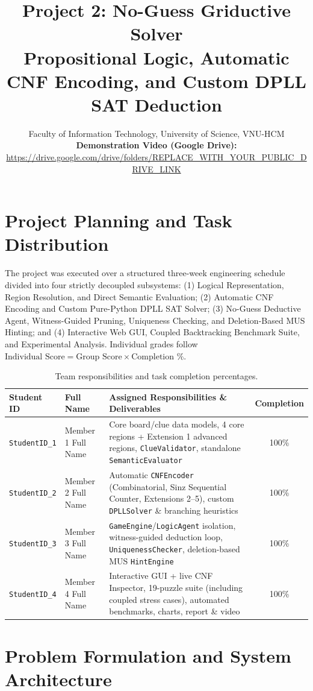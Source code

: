 \documentclass[11pt,a4paper]{article}
\title{\textbf{\LARGE Project 2: No-Guess Griductive Solver}\\[4pt]
\large Propositional Logic, Automatic CNF Encoding, and Custom DPLL SAT Deduction}
\author{Faculty of Information Technology, University of Science, VNU-HCM\\
\textbf{Demonstration Video (Google Drive):} \url{https://drive.google.com/drive/folders/REPLACE_WITH_YOUR_PUBLIC_DRIVE_LINK}}
\date{}
\begin{document}
\maketitle
\thispagestyle{fancy}

\section{Project Planning and Task Distribution}
The project was executed over a structured three-week engineering schedule divided into four strictly decoupled subsystems: (1) Logical Representation, Region Resolution, and Direct Semantic Evaluation; (2) Automatic CNF Encoding and Custom Pure-Python DPLL SAT Solver; (3) No-Guess Deductive Agent, Witness-Guided Pruning, Uniqueness Checking, and Deletion-Based MUS Hinting; and (4) Interactive Web GUI, Coupled Backtracking Benchmark Suite, and Experimental Analysis. Individual grades follow $\text{Individual Score} = \text{Group Score} \times \text{Completion \%}$.

\begin{table}[h!]
\centering
\small
\begin{tabular}{@{}llp{8.4cm}c@{}}
\toprule
\textbf{Student ID} & \textbf{Full Name} & \textbf{Assigned Responsibilities \& Deliverables} & \textbf{Completion} \\
\midrule
\texttt{StudentID\_1} & Member 1 Full Name & Core board/clue data models, 4 core regions + Extension 1 advanced regions, \texttt{ClueValidator}, standalone \texttt{SemanticEvaluator} & 100\% \\
\texttt{StudentID\_2} & Member 2 Full Name & Automatic \texttt{CNFEncoder} (Combinatorial, Sinz Sequential Counter, Extensions 2--5), custom \texttt{DPLLSolver} \& branching heuristics & 100\% \\
\texttt{StudentID\_3} & Member 3 Full Name & \texttt{GameEngine}/\texttt{LogicAgent} isolation, witness-guided deduction loop, \texttt{UniquenessChecker}, deletion-based MUS \texttt{HintEngine} & 100\% \\
\texttt{StudentID\_4} & Member 4 Full Name & Interactive GUI + live CNF Inspector, 19-puzzle suite (including coupled stress cases), automated benchmarks, charts, report \& video & 100\% \\
\bottomrule
\end{tabular}
\caption{Team responsibilities and task completion percentages.}
\end{table}

\section{Problem Formulation and System Architecture}
\end{document}
